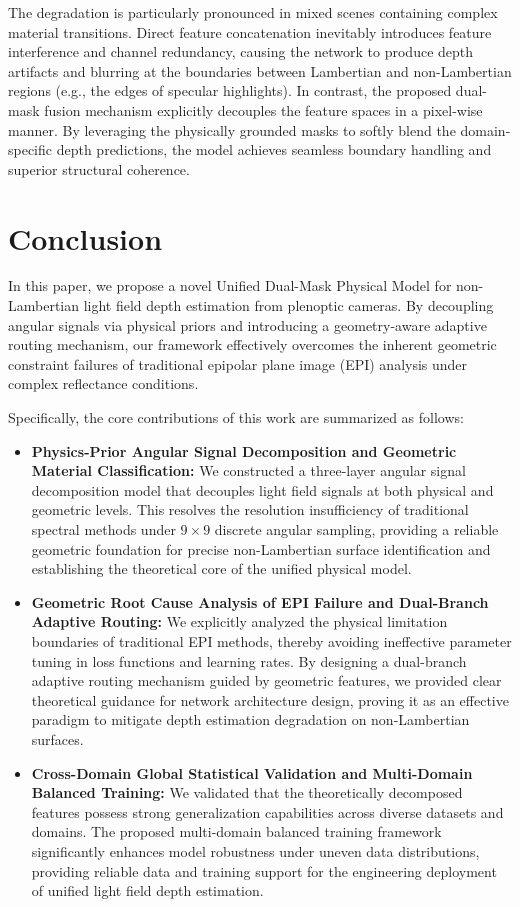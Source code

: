 \documentclass[lettersize,journal]{IEEEtran}
\begin{document}
The degradation is particularly pronounced in mixed scenes containing complex material transitions. Direct feature concatenation inevitably introduces feature interference and channel redundancy, causing the network to produce depth artifacts and blurring at the boundaries between Lambertian and non-Lambertian regions (e.g., the edges of specular highlights). In contrast, the proposed dual-mask fusion mechanism explicitly decouples the feature spaces in a pixel-wise manner. By leveraging the physically grounded masks to softly blend the domain-specific depth predictions, the model achieves seamless boundary handling and superior structural coherence.

\section{Conclusion}

In this paper, we propose a novel Unified Dual-Mask Physical Model for non-Lambertian light field depth estimation from plenoptic cameras. By decoupling angular signals via physical priors and introducing a geometry-aware adaptive routing mechanism, our framework effectively overcomes the inherent geometric constraint failures of traditional epipolar plane image (EPI) analysis under complex reflectance conditions. 

Specifically, the core contributions of this work are summarized as follows:
\begin{itemize}
    \item \textbf{Physics-Prior Angular Signal Decomposition and Geometric Material Classification:} We constructed a three-layer angular signal decomposition model that decouples light field signals at both physical and geometric levels. This resolves the resolution insufficiency of traditional spectral methods under $9 \times 9$ discrete angular sampling, providing a reliable geometric foundation for precise non-Lambertian surface identification and establishing the theoretical core of the unified physical model.
    \item \textbf{Geometric Root Cause Analysis of EPI Failure and Dual-Branch Adaptive Routing:} We explicitly analyzed the physical limitation boundaries of traditional EPI methods, thereby avoiding ineffective parameter tuning in loss functions and learning rates. By designing a dual-branch adaptive routing mechanism guided by geometric features, we provided clear theoretical guidance for network architecture design, proving it as an effective paradigm to mitigate depth estimation degradation on non-Lambertian surfaces.
    \item \textbf{Cross-Domain Global Statistical Validation and Multi-Domain Balanced Training:} We validated that the theoretically decomposed features possess strong generalization capabilities across diverse datasets and domains. The proposed multi-domain balanced training framework significantly enhances model robustness under uneven data distributions, providing reliable data and training support for the engineering deployment of unified light field depth estimation.
\end{itemize}
\end{document}
